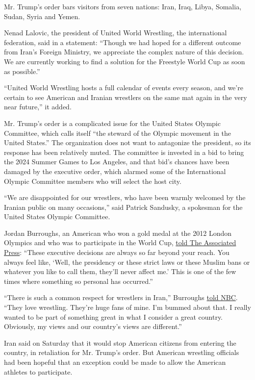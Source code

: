 Mr. Trump's order bars visitors from seven nations: Iran, Iraq, Libya,
Somalia, Sudan, Syria and Yemen.

Nenad Lalovic, the president of United World Wrestling, the
international federation, said in a statement: ``Though we had hoped for
a different outcome from Iran's Foreign Ministry, we appreciate the
complex nature of this decision. We are currently working to find a
solution for the Freestyle World Cup as soon as possible.''

``United World Wrestling hosts a full calendar of events every season,
and we're certain to see American and Iranian wrestlers on the same mat
again in the very near future,'' it added.

Mr. Trump's order is a complicated issue for the United States Olympic
Committee, which calls itself ``the steward of the Olympic movement in
the United States.'' The organization does not want to antagonize the
president, so its response has been relatively muted. The committee is
invested in a bid to bring the 2024 Summer Games to Los Angeles, and
that bid's chances have been damaged by the executive order, which
alarmed some of the International Olympic Committee members who will
select the host city.

``We are disappointed for our wrestlers, who have been warmly welcomed
by the Iranian public on many occasions,'' said Patrick Sandusky, a
spokesman for the United States Olympic Committee.

Jordan Burroughs, an American who won a gold medal at the 2012 London
Olympics and who was to participate in the World Cup,
\href{http://www.mcclatchydc.com/news/politics-government/national-politics/article130506864.html}{told
The Associated Press}: ``These executive decisions are always so far
beyond your reach. You always feel like, `Well, the presidency or these
strict laws or these Muslim bans or whatever you like to call them,
they'll never affect me.' This is one of the few times where something
so personal has occurred.''

``There is such a common respect for wrestlers in Iran,'' Burroughs
\href{http://olympics.nbcsports.com/2017/02/03/jordan-burroughs-wrestling-iran-travel-ban/}{told
NBC}. ``They love wrestling. They're huge fans of mine. I'm bummed about
that. I really wanted to be part of something great in what I consider a
great country. Obviously, my views and our country's views are
different.''

Iran said on Saturday that it would stop American citizens from entering
the country, in retaliation for Mr. Trump's order. But American
wrestling officials had been hopeful that an exception could be made to
allow the American athletes to participate.


